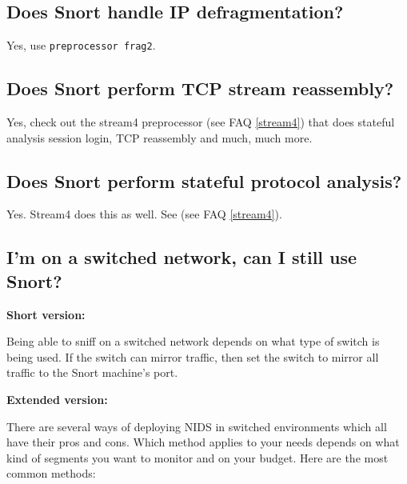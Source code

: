 \documentclass{article}
\newcommand{\myref}[1]{(see FAQ \ref{#1})}
\begin{document}
	
\subsection{Does Snort handle IP defragmentation?}

Yes, use {\tt preprocessor frag2}.

\subsection{Does Snort perform TCP stream reassembly?}

Yes, check out the stream4 preprocessor \myref{stream4} that does stateful 
analysis session login, TCP reassembly and much, much more.

\subsection{Does Snort perform stateful protocol analysis?}

Yes. Stream4 does this as well. See \myref{stream4}.

\subsection{I'm on a switched network, can I still use Snort?}

{\bf Short version:}

Being able to sniff on a switched network depends on what type of switch is
being used. If the switch can mirror traffic, then set the switch to mirror all
traffic to the Snort machine's port.

{\bf Extended version:}

There are several ways of deploying NIDS in switched environments which all
have their pros and cons. Which method applies to your needs depends on what
kind of segments you want to monitor and on your budget. Here are the most
common methods:
\end{document}
